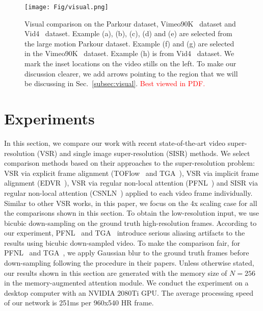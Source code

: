 \begin{figure*}[t]
    \centering
    \texttt{[image: Fig/visual.png]}
    \caption{Visual comparison on the Parkour dataset, Vimeo90K~\cite{vimeo90k} dataset and Vid4~\cite{frvsr} dataset. Example (a), (b), (c), (d) and (e) are selected from the large motion Parkour dataset. Example (f) and (g) are selected in the Vimeo90K~\cite{vimeo90k} dataset. Example (h) is from Vid4~\cite{frvsr} dataset. We mark the inset locations on the video stills on the left. To make our discussion clearer, we add arrows pointing to the region that we will be discussing in Sec.~\ref{subsec:visual}. \textcolor{red}{Best viewed in PDF.}}
    \label{fig:visual}
    \vspace{-10pt}
\end{figure*}

\section{Experiments}\label{sec:result}
In this section, we compare our work with recent state-of-the-art video super-resolution (VSR) and single image super-resolution (SISR) methods.
We select comparison methods based on their approaches to the super-resolution problem: VSR via explicit frame alignment (TOFlow~\cite{vimeo90k} and TGA~\cite{tga}), VSR via implicit frame alignment (EDVR~\cite{edvr}), VSR via regular non-local attention (PFNL~\cite{pfnl}) and SISR via regular non-local attention (CSNLN~\cite{mei}) applied to each video frame individually.
Similar to other VSR works, in this paper, we focus on the 4x scaling case for all the comparisons shown in this section.
To obtain the low-resolution input, we use bicubic down-sampling on the ground truth high-resolution frames.
According to our experiment, PFNL~\cite{pfnl} and TGA~\cite{tga} introduce serious aliasing artifacts to the results using bicubic down-sampled video.
To make the comparison fair, for PFNL~\cite{pfnl} and TGA~\cite{tga}, we apply Gaussian blur to the ground truth frames before down-sampling following the procedure in their papers.
Unless otherwise stated, our results shown in this section are generated with the memory size of $N=256$ in the memory-augmented attention module.
We conduct the experiment on a desktop computer with an NVIDIA 2080Ti GPU.
The average processing speed of our network is 251ms per 960x540 HR frame. 

